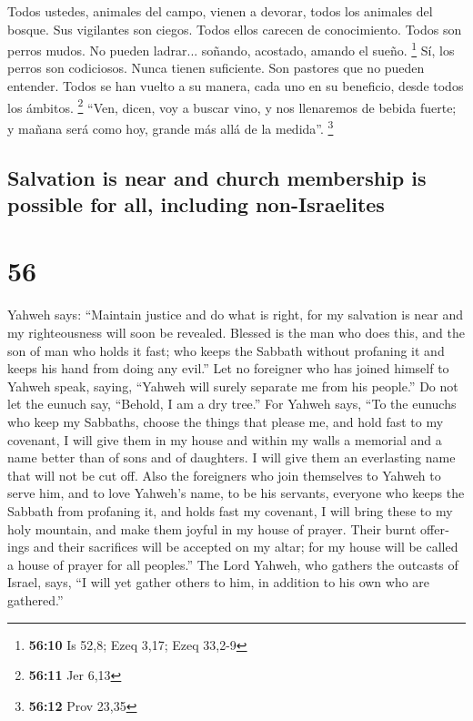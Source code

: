 \begin{paracol}{2}
 Todos ustedes, animales del campo, vienen a devorar,
todos los animales del bosque.  Sus vigilantes son
ciegos. Todos ellos carecen de conocimiento. Todos son perros mudos. No
pueden ladrar... soñando, acostado, amando el sueño. \footnote{\textbf{56:10}
  Is 52,8; Ezeq 3,17; Ezeq 33,2-9}  Sí, los perros son
codiciosos. Nunca tienen suficiente. Son pastores que no pueden
entender. Todos se han vuelto a su manera, cada uno en su beneficio,
desde todos los ámbitos. \footnote{\textbf{56:11} Jer 6,13}
 ``Ven, dicen, voy a buscar vino, y nos llenaremos de
bebida fuerte; y mañana será como hoy, grande más allá de la medida''.
\footnote{\textbf{56:12} Prov 23,35}

\switchcolumn
\begin{otherlanguage}{english}

\hypertarget{salvation-is-near-and-church-membership-is-possible-for-all-including-non-israelites}{%
\subsection{Salvation is near and church membership is possible for all,
including
non-Israelites}\label{salvation-is-near-and-church-membership-is-possible-for-all-including-non-israelites}}

\hypertarget{section-111}{%
\section{56}\label{section-111}}

 Yahweh says: ``Maintain justice and do what is right, for
my salvation is near and my righteousness will soon be revealed.
 Blessed is the man who does this, and the son of man who
holds it fast; who keeps the Sabbath without profaning it and keeps his
hand from doing any evil.''  Let no foreigner who has
joined himself to Yahweh speak, saying, ``Yahweh will surely separate me
from his people.'' Do not let the eunuch say, ``Behold, I am a dry
tree.''  For Yahweh says, ``To the eunuchs who keep my
Sabbaths, choose the things that please me, and hold fast to my
covenant,  I will give them in my house and within my
walls a memorial and a name better than of sons and of daughters. I will
give them an everlasting name that will not be cut off. 
Also the foreigners who join themselves to Yahweh to serve him, and to
love Yahweh's name, to be his servants, everyone who keeps the Sabbath
from profaning it, and holds fast my covenant,  I will
bring these to my holy mountain, and make them joyful in my house of
prayer. Their burnt offerings and their sacrifices will be accepted on
my altar; for my house will be called a house of prayer for all
peoples.''  The Lord Yahweh, who gathers the outcasts of
Israel, says, ``I will yet gather others to him, in addition to his own
who are gathered.''


\end{otherlanguage}
\end{paracol}
